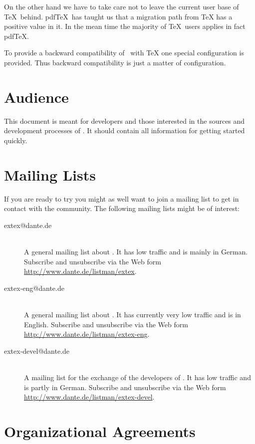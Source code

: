 \documentclass{extex-doc}
\begin{document}
On the other hand we have to take care not to leave the current user
base of \TeX\ behind. pdf\TeX\ has taught us that a migration path
from \TeX{} has a positive value in it. In the mean time
the majority of \TeX\ users applies in fact
pdf\TeX{}.

To provide a backward compatibility of \ExTeX\ with
\TeX{} one special configuration is provided. Thus
backward compatibility is just a matter of configuration.


\section{Audience}

This document is meant for developers and those interested in the
sources and development processes of \ExTeX. It should contain all
information for getting started quickly.


\section{Mailing Lists}

If you are ready to try \ExTeX{} you might as well want to join a
mailing list to get in contact with the community. The following
mailing lists might be of interest:

\begin{description}
\item[extex@dante.de] \ \\
  A general mailing list about \ExTeX. It has low traffic and is
  mainly in German. Subscribe and unsubscribe via the Web form
  \url{http://www.dante.de/listman/extex}.
\item[extex-eng@dante.de] \ \\
  A general mailing list about \ExTeX. It has currently very low
  traffic and is in English. Subscribe and unsubscribe via the Web
  form \url{http://www.dante.de/listman/extex-eng}.
\item[extex-devel@dante.de] \ \\
  A mailing list for the exchange of the developers of \ExTeX. It has
  low traffic and is partly in German. Subscribe and unsubscribe via
  the Web form \url{http://www.dante.de/listman/extex-devel}.
\end{description}


\section{Organizational Agreements}
\end{document}
